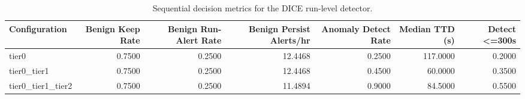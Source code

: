 \begin{table}[t]
\centering
\caption{Sequential decision metrics for the DICE run-level detector.}
\label{tab:dice_sequential_metrics}
\footnotesize
\begin{tabular}{lrrrrrr}
\toprule
Configuration & Benign Keep Rate & Benign Run-Alert Rate & Benign Persist Alerts/hr & Anomaly Detect Rate & Median TTD (s) & Detect <=300s \\
\midrule
tier0 & 0.7500 & 0.2500 & 12.4468 & 0.2500 & 117.0000 & 0.2000 \\
tier0_tier1 & 0.7500 & 0.2500 & 12.4468 & 0.4500 & 60.0000 & 0.3500 \\
tier0_tier1_tier2 & 0.7500 & 0.2500 & 11.4894 & 0.9000 & 84.5000 & 0.5500 \\
\bottomrule
\end{tabular}

\end{table}
